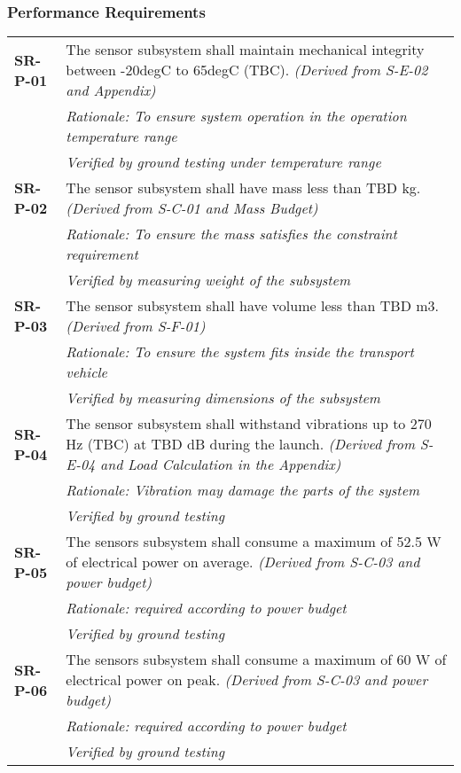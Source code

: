 \subsubsection*{Performance Requirements}
\vspace{-15pt}
\begin{longtable}{P{2cm}P{13.25cm}}
\textbf{SR-P-01}	&
The sensor subsystem shall maintain mechanical integrity between -20\gls{degC} to 65\gls{degC} (\gls{TBC}).
\textit{(Derived from S-E-02 and Appendix)}\\
& \textit{Rationale: To ensure system operation in the operation temperature range} \\
& \textit{Verified by ground testing under temperature range}	\\

\textbf{SR-P-02}	& The sensor subsystem shall have mass less than \gls{TBD} \gls{kg}.
\textit{(Derived from S-C-01 and Mass Budget)}	\\
& \textit{Rationale: To ensure the mass satisfies the constraint requirement} \\
& \textit{Verified by measuring weight of the subsystem}	\\

\textbf{SR-P-03}	&
The sensor subsystem shall have volume less than \gls{TBD} \gls{m3}.
\textit{(Derived from S-F-01)}	\\
& \textit{Rationale: To ensure the system fits inside the transport vehicle} \\
& \textit{Verified by measuring dimensions of the subsystem}	\\

\textbf{SR-P-04}	&
The sensor subsystem shall withstand vibrations up to 270 \gls{Hz} (\gls{TBC}) at \gls{TBD} \gls{dB} during the launch.
\textit{(Derived from S-E-04 and Load Calculation in the Appendix)}	\\
& \textit{Rationale: Vibration may damage the parts of the system} \\
& \textit{Verified by ground testing}	\\

\textbf{SR-P-05}	& The sensors subsystem shall consume a maximum of 52.5 \gls{W} of electrical power on average. 
\textit{(Derived from S-C-03 and power budget)}	\\
& \textit{Rationale: required according to power budget} \\
& \textit{Verified by ground testing}	\\

\textbf{SR-P-06}	& The sensors subsystem shall consume a maximum of 60 \gls{W} of electrical power on peak. 
\textit{(Derived from S-C-03 and power budget)}	\\
& \textit{Rationale: required according to power budget} \\
&  \textit{Verified by ground testing}	\\


\end{longtable}
